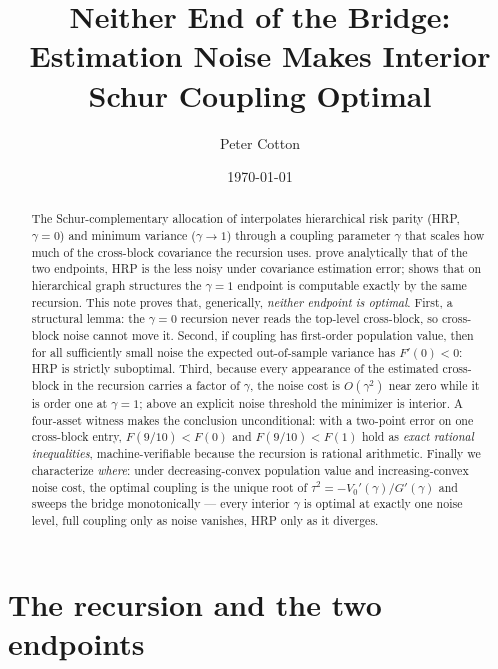 \documentclass[11pt]{article}
\title{Neither End of the Bridge:\\ Estimation Noise Makes Interior Schur Coupling Optimal}
\author{Peter Cotton}
\date{\today}
\begin{document}
\maketitle

\begin{abstract}
The Schur-complementary allocation of \textcite{cotton2024schur} interpolates
hierarchical risk parity (HRP, $\gamma = 0$) and minimum variance
($\gamma \to 1$) through a coupling parameter $\gamma$ that scales how much of
the cross-block covariance the recursion uses. \textcite{antonov2025hrp} prove
analytically that of the two endpoints, HRP is the less noisy under covariance
estimation error; \textcite{mograby2025} shows that on hierarchical graph
structures the $\gamma = 1$ endpoint is computable exactly by the same
recursion. This note proves that, generically, \emph{neither endpoint is
optimal}. First, a structural lemma: the $\gamma = 0$ recursion never reads
the top-level cross-block, so cross-block noise cannot move it. Second, if
coupling has first-order population value, then for all sufficiently small
noise the expected out-of-sample variance has $F'(0) < 0$: HRP is strictly
suboptimal. Third, because every appearance of the estimated cross-block in
the recursion carries a factor of $\gamma$, the noise cost is $O(\gamma^2)$
near zero while it is order one at $\gamma = 1$; above an explicit noise
threshold the minimizer is interior. A four-asset witness makes the
conclusion unconditional: with a two-point error on one cross-block entry,
$F(9/10) < F(0)$ and $F(9/10) < F(1)$ hold as \emph{exact rational
inequalities}, machine-verifiable because the recursion is rational
arithmetic. Finally we characterize \emph{where}: under decreasing-convex
population value and increasing-convex noise cost, the optimal coupling is
the unique root of $\tau^2 = -V_0'(\gamma)/G'(\gamma)$ and sweeps the bridge
monotonically --- every interior $\gamma$ is optimal at exactly one noise
level, full coupling only as noise vanishes, HRP only as it diverges.
\end{abstract}

\section{The recursion and the two endpoints}
\label{sec:setup}
\end{document}
